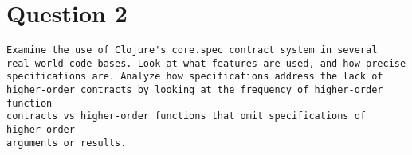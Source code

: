 \section{Question 2}

\begin{verbatim}
Examine the use of Clojure's core.spec contract system in several
real world code bases. Look at what features are used, and how precise
specifications are. Analyze how specifications address the lack of
higher-order contracts by looking at the frequency of higher-order function
contracts vs higher-order functions that omit specifications of higher-order
arguments or results.
\end{verbatim}











